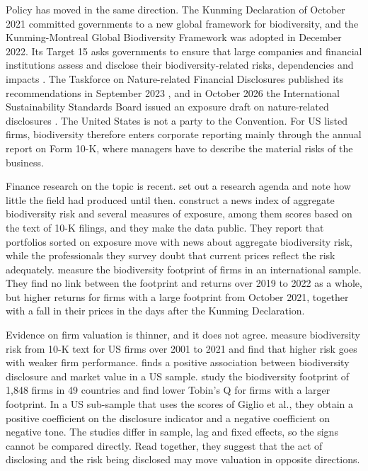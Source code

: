 \documentclass[12pt,a4paper]{article}
\begin{document}
Policy has moved in the same direction. The Kunming Declaration of October 2021 committed governments to a new global framework for biodiversity, and the Kunming-Montreal Global Biodiversity Framework was adopted in December 2022. Its Target 15 asks governments to ensure that large companies and financial institutions assess and disclose their biodiversity-related risks, dependencies and impacts \citep{cbd2022}. The Taskforce on Nature-related Financial Disclosures published its recommendations in September 2023 \citep{tnfd2023}, and in October 2026 the International Sustainability Standards Board issued an exposure draft on nature-related disclosures \citep{issb2026}. The United States is not a party to the Convention. For US listed firms, biodiversity therefore enters corporate reporting mainly through the annual report on Form 10-K, where managers have to describe the material risks of the business.

Finance research on the topic is recent. \citet{karolyi2023} set out a research agenda and note how little the field had produced until then. \citet{giglio2026} construct a news index of aggregate biodiversity risk and several measures of exposure, among them scores based on the text of 10-K filings, and they make the data public. They report that portfolios sorted on exposure move with news about aggregate biodiversity risk, while the professionals they survey doubt that current prices reflect the risk adequately. \citet{garel2024} measure the biodiversity footprint of firms in an international sample. They find no link between the footprint and returns over 2019 to 2022 as a whole, but higher returns for firms with a large footprint from October 2021, together with a fall in their prices in the days after the Kunming Declaration.

Evidence on firm valuation is thinner, and it does not agree. \citet{bach2025} measure biodiversity risk from 10-K text for US firms over 2001 to 2021 and find that higher risk goes with weaker firm performance. \citet{he2024} finds a positive association between biodiversity disclosure and market value in a US sample. \citet{cosma2025} study the biodiversity footprint of 1,848 firms in 49 countries and find lower Tobin's Q for firms with a larger footprint. In a US sub-sample that uses the scores of Giglio et al., they obtain a positive coefficient on the disclosure indicator and a negative coefficient on negative tone. The studies differ in sample, lag and fixed effects, so the signs cannot be compared directly. Read together, they suggest that the act of disclosing and the risk being disclosed may move valuation in opposite directions.
\end{document}
